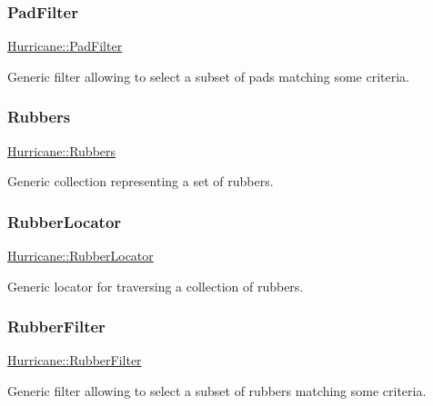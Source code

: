 \subsubsection{\texorpdfstring{Pad\+Filter}{PadFilter}}
{\footnotesize\ttfamily \mbox{\hyperlink{namespaceHurricane_aeff6d8148675fc30f366906bfc652c25}{Hurricane\+::\+Pad\+Filter}}}

Generic filter allowing to select a subset of pads matching some criteria. \mbox{\label{namespaceHurricane_af8923abd57508cc44931a00d61b564ad}} 
\subsubsection{\texorpdfstring{Rubbers}{Rubbers}}
{\footnotesize\ttfamily \mbox{\hyperlink{namespaceHurricane_af8923abd57508cc44931a00d61b564ad}{Hurricane\+::\+Rubbers}}}

Generic collection representing a set of rubbers. \mbox{\label{namespaceHurricane_ae4f27278e942109c3c47ad1b741f9df3}} 
\subsubsection{\texorpdfstring{Rubber\+Locator}{RubberLocator}}
{\footnotesize\ttfamily \mbox{\hyperlink{namespaceHurricane_ae4f27278e942109c3c47ad1b741f9df3}{Hurricane\+::\+Rubber\+Locator}}}

Generic locator for traversing a collection of rubbers. \mbox{\label{namespaceHurricane_ae331d428a7e324593e4a47dac023b7f0}} 
\subsubsection{\texorpdfstring{Rubber\+Filter}{RubberFilter}}
{\footnotesize\ttfamily \mbox{\hyperlink{namespaceHurricane_ae331d428a7e324593e4a47dac023b7f0}{Hurricane\+::\+Rubber\+Filter}}}

Generic filter allowing to select a subset of rubbers matching some criteria. \mbox{\label{namespaceHurricane_afd7bca6dad4be54b7c03b0463e6c0004}} 
